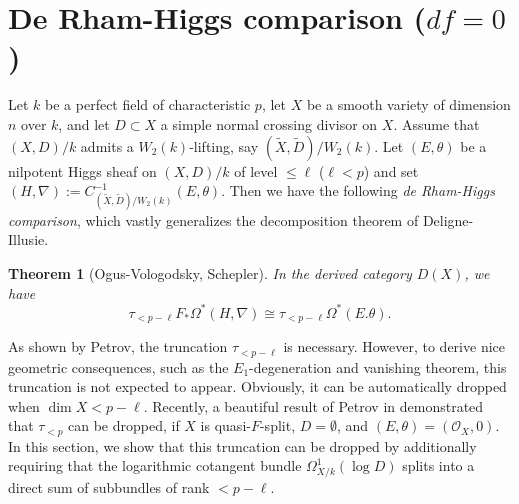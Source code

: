 \documentclass[12pt, a4paper]{article}
\newtheorem{theorem}{Theorem}[section]
\begin{document}
\section{De Rham-Higgs comparison ($df=0$)}
Let $k$ be a perfect field of characteristic $p$, let $X$ be a smooth variety of dimension $n$ over $k$, and let $D\subset X$ a simple normal crossing divisor on $X$. Assume that $(X,D)/k$ admits a $W_2(k)$-lifting, say $(\tilde X,\tilde D)/W_2(k)$. Let $(E,\theta)$ be a nilpotent Higgs sheaf on $(X,D)/k$ of level $\leq\ell$ ($\ell<p$) and set $(H,\nabla):=C^{-1}_{(\tilde X,\tilde D)/W_2(k)}(E,\theta)$. Then we have the following \emph{de Rham-Higgs comparison}, which vastly generalizes the decomposition theorem of Deligne-Illusie\cite[Théorème 2.1]{DI}.
\begin{theorem}[{{Ogus-Vologodsky\cite[Corollary 2.27]{OV}, Schepler\cite[Corollary 5.7]{Schepler}}}]\label{OV}
In the derived category $D(X)$, we have
$$
\tau_{<p-\ell}F_*\Omega^*(H,\nabla)\cong\tau_{<p-\ell}\Omega^*(E.\theta).
$$   
\end{theorem} 
As shown by Petrov\cite[Corollary 10.7]{P1}, the truncation $\tau_{<p-\ell}$ is necessary. However, to derive nice geometric consequences, such as the $E_1$-degeneration and vanishing theorem, this truncation is not expected to appear. Obviously, it can be automatically dropped when $\dim X<p-\ell$. Recently, a beautiful result of Petrov in \cite[Corollary 4.6]{P2} demonstrated that $\tau_{<p}$ can be dropped, if $X$ is quasi-$F$-split, $D=\emptyset$, and $(E,\theta)=(\mathcal O_X,0)$. In this section, we show that this truncation can be dropped by additionally requiring that the logarithmic cotangent bundle $\Omega^1_{X/k}(\log D)$ splits into a direct sum of subbundles of rank $< p-\ell$. 
\end{document}
